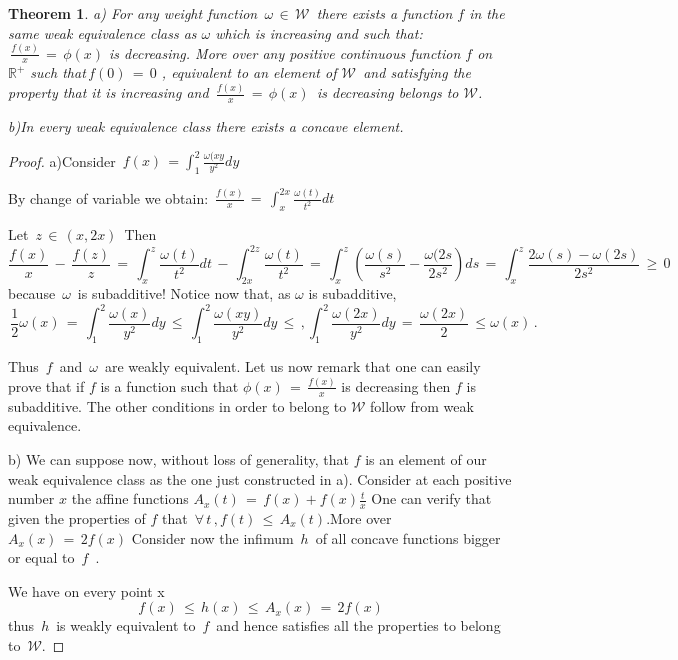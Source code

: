 \documentclass[12pt,a4paper]{amsart}
\newcommand{\RR}{\mathbb R}
\newtheorem{theorem}{Theorem}[section]
\begin{document}
\begin{theorem}
a) For any weight function $\,\omega\,\in\,\mathcal{W}\,$
there exists a function $f$ in the same weak equivalence class as $\omega$ which is increasing and such that: 
$\,\frac{f(x)}{x}\,=\,\phi(x)$ is decreasing.
More over any positive continuous function $f$ on  
$\RR^+$ such that$\,f(0)\,=\,0$ ,  equivalent to an element of $\mathcal{W}\,$ and satisfying the property that it is increasing and $\,\frac{f(x)}{x}\,=\,\phi(x)\,$ is decreasing belongs to $\mathcal{W}$.

b)In every weak equivalence class there exists a concave element.
\end{theorem}
\begin{proof}

a)Consider $\,f(x)\,=\int_1^2\frac{\omega(xy}{y^2}dy \,$

By change of variable we obtain: 
$\,\frac{f(x)}{x}\,
=\,\int_x^{2x}\frac{\omega(t)}{t^2}dt\,$

Let $\,z\,\in\,(x,2x)\,$
Then 
$$ \frac{f(x)}{x}\,-\,\frac{f(z)}{z}
\,=\,\int_x^z\frac{\omega(t)}{t^2}dt\,
-\,\int_{2x}^{2z}\frac{\omega(t)}{t^2}\,
  =\,
  \int_x^z(\frac{\omega(s)}{s^2}-\frac{\omega(2s}{2s^2})ds\,
 =\,\int_x^z\frac{2\omega(s)-\omega(2s)}{2s^2}\,
  \geq\,0\,$$ 
  because $\,\omega\,$ is subadditive!
  Notice now that, as $\omega$ is subadditive,
  $$\,\frac{1}{2}\omega(x)\,
  =\,\int_1^2\frac{\omega(x)}{y^2}dy\,\leq\,\int_1^2\frac{\omega(xy)}{y^2}dy\,\leq\,,\int_1^2\frac{\omega(2x)}{y^2}dy\,=
  \,\frac{\omega(2x)}{2}\,\leq\omega(x)\,.                   $$ 
  
  
  Thus $\,f\,$ and $\,\omega\,$ are weakly equivalent.
Let us now remark that one can easily prove that if $f$ is a function such that $ \phi(x)\,= \,\frac{f(x)}{x}$ is decreasing then $f$ is subadditive. The other conditions in order to belong to $\mathcal{W}$ follow from weak equivalence.



b) We can suppose now, without loss of generality, that $f$ is an element of our weak equivalence class as the one just  constructed in a).
Consider at each positive number $x$ the affine functions 
$A_x(t)\,=\,f(x)+f(x) \frac{t}{x}$
One can verify that given the properties of $f$ that
$\,\forall\,t\,,f(t)\,\leq\,A_x(t)$.More over 
$A_x(x)\,=\,2f(x)$ Consider now the infimum $\,h\,$ of all concave functions bigger or equal to $\,f\,$ .

We have on every point x 
$$\,f(x)\,\leq\,h(x)\,\leq\,A_x(x)\,=\,2f(x)$$
thus $\,h\,$ is weakly equivalent to $\,f\,$ and hence satisfies all the properties to belong to 
$\,\mathcal{W}.$

\end{proof}
\end{document}
